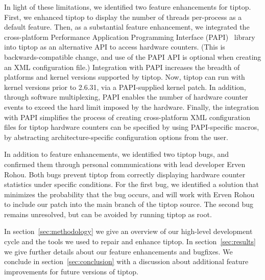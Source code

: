 In light of these limitations, we identified two feature enhancements for tiptop.
First, we enhanced tiptop to display the number of threads per-process as a default feature.
Then, as a substantial feature enhancement, we integrated the cross-platform Performance Application Programming Interface (PAPI)~\cite{Mucci99papi:a} library into tiptop as an alternative API to access hardware counters. (This is backwards-compatible change, and use of the PAPI API is optional when creating an XML configuration file.)
Integration with PAPI increases the breadth of platforms and kernel versions supported by tiptop.
Now, tiptop can run with kernel versions prior to 2.6.31, via a PAPI-supplied kernel patch.
In addition, through software multiplexing, PAPI enables the number of hardware counter events to exceed the hard limit imposed by the hardware.
Finally, the integration with PAPI simplifies the process of creating cross-platform XML configuration files for tiptop hardware counters can be specified by using PAPI-specific macros, by abstracting architecture-specific configuration options from the user.

In addition to feature enhancements, we identified two tiptop bugs, and confirmed them through personal communications with lead developer Erven Rohou.
Both bugs prevent tiptop from correctly displaying hardware counter statistics under specific conditions.
For the first bug, we identified a solution that minimizes the probability that the bug occurs, and will work with Erven Rohou to include our patch into the main branch of the tiptop source.
The second bug remains unresolved, but can be avoided by running tiptop as root.

In section~\ref{sec:methodology} we give an overview of our high-level development cycle and the tools we used to repair and enhance tiptop.
In section~\ref{sec:results} we give further details about our feature enhancements and bugfixes.
We conclude in section~\ref{sec:conclusion} with a discussion about additional feature improvements for future versions of tiptop.

